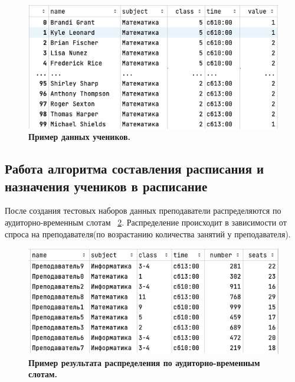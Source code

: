 \begin{figure}[!ht]
  \centering
  \includegraphics[width=\linewidth]{Images/data_3.png}
  \caption{\textbf{Пример данных учеников.}}
  \label{data3}
\end{figure}

\subsection{Работа алгоритма составления расписания и назначения учеников в расписание}
\label{PRIMe-SubSecDBSCAN}
После создания тестовых наборов данных преподаватели распределяются по аудиторно-временным слотам ~\ref{dist_1}. Распределение происходит в зависимости от спроса на преподавателя(по возрастанию количества занятий у преподавателя).\begin{figure}[!ht]
  \centering
  \includegraphics[width=\linewidth]{Images/dist_1.png}
  \caption{\textbf{Пример результата распределения по аудиторно-временным слотам.}}
  \label{dist_1}
\end{figure}

